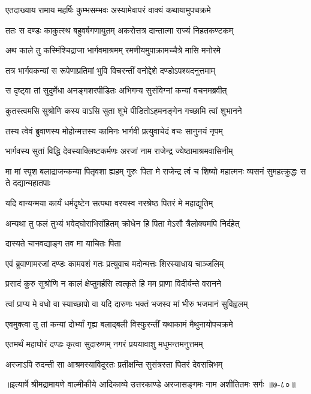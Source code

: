 
\twolineshloka
{एतदाख्याय रामाय महर्षिः कुम्भसम्भवः}
{अस्यामेवापरं वाक्यं कथायामुपचक्रमे} %

\twolineshloka
{ततः स दण्डः काकुत्स्थ बहुवर्षगणायुतम्}
{अकरोत्तत्र दान्तात्मा राज्यं निहतकण्टकम्} %

\twolineshloka
{अथ काले तु कस्मिंश्चिद्राजा भार्गवमाश्रमम्}
{रमणीयमुपाक्रामच्चैत्रे मासि मनोरमे} %

\twolineshloka
{तत्र भार्गवकन्यां स रूपेणाप्रतिमां भुवि}
{विचरन्तीं वनोद्देशे दण्डोऽपश्यदनुत्तमाम्} %

\twolineshloka
{स दृष्ट्वा तां सुदुर्मेधा अनङ्गशरपीडितः}
{अभिगम्य सुसंविग्नां कन्यां वचनमब्रवीत्} %

\twolineshloka
{कुतस्त्वमसि सुश्रोणि कस्य वाऽसि सुता शुभे}
{पीडितोऽहमनङ्गेन गच्छामि त्वां शुभानने} %

\twolineshloka
{तस्य त्वेवं ब्रुवाणस्य मोहोन्मत्तस्य कामिनः}
{भार्गवी प्रत्युवाचेदं वचः सानुनयं नृपम्} %

\twolineshloka
{भार्गवस्य सुतां विद्धि देवस्याक्लिष्टकर्मणः}
{अरजां नाम राजेन्द्र ज्येष्ठामाश्रमवासिनीम्} %

\threelineshloka
{मा मां स्पृश बलाद्राजन्कन्या पितृवशा ह्यहम्}
{गुरुः पिता मे राजेन्द्र त्वं च शिष्यो महात्मनः}
{व्यसनं सुमहत्क्रुद्धः स ते दद्यान्महातपाः} %

\twolineshloka
{यदि वान्यन्मया कार्यं धर्मदृष्टेन सत्पथा}
{वरयस्व नरश्रेष्ठ पितरं मे महाद्युतिम्} %

\twolineshloka
{अन्यथा तु फलं तुभ्यं भवेद्घोराभिसंहितम्}
{क्रोधेन हि पिता मेऽसौ त्रैलोक्यमपि निर्दहेत्} %

\onelineshloka
{दास्यते चानवद्याङ्ग तव मा याचितः पिता} %

\twolineshloka
{एवं ब्रुवाणामरजां दण्डः कामवशं गतः}
{प्रत्युवाच मदोन्मत्तः शिरस्याधाय चाञ्जलिम्} %

\twolineshloka
{प्रसादं कुरु सुश्रोणि न कालं क्षेप्तुमर्हसि}
{त्वत्कृते हि मम प्राणा विदीर्यन्ते वरानने} %

\twolineshloka
{त्वां प्राप्य मे वधो वा स्याच्छापो वा यदि दारुणः}
{भक्तं भजस्व मां भीरु भजमानं सुविह्वलम्} %

\twolineshloka
{एवमुक्त्वा तु तां कन्यां दोर्भ्यां गृह्य बलाद्बली}
{विस्फुरन्तीं यथाकामं मैथुनायोपचक्रमे} %

\twolineshloka
{एतमर्थं महाघोरं दण्डः कृत्वा सुदारुणम्}
{नगरं प्रययावाशु मधुमन्तमनुत्तमम्} %

\twolineshloka
{अरजाऽपि रुदन्ती सा आश्रमस्याविदूरतः}
{प्रतीक्षन्ति सुसंत्रस्ता पितरं देवसन्निभम्} %


॥इत्यार्षे श्रीमद्रामायणे वाल्मीकीये आदिकाव्ये उत्तरकाण्डे अरजासङ्गमः नाम अशीतितमः सर्गः ॥७-८०॥
